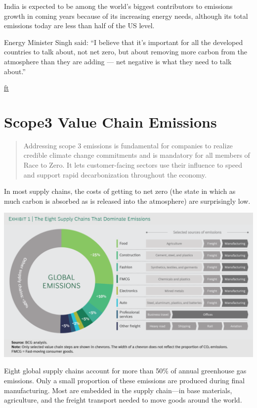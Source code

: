 \documentclass[
]{book}
\begin{document}
India is expected to be among the world's biggest contributors to emissions growth in coming years because of its increasing energy needs, although its total emissions today are less than half of the US level.

Energy Minister Singh said: ``I believe that it's important for all the developed countries to talk about, not net zero, but about removing more carbon from the atmosphere than they are adding --- net negative is what they need to talk about.''

\href{https://www.ft.com/content/b45113f8-5b5b-4f3e-a450-0a2b100595f6?shareType=nongift}{ft}

\hypertarget{scope3-value-chain-emissions}{%
\section{Scope3 Value Chain Emissions}\label{scope3-value-chain-emissions}}

\begin{quote}
Addressing scope 3 emissions is fundamental for companies to realize credible climate change commitments and is mandatory for all members of Race to Zero. It lets customer-facing sectors use their influence to speed and support rapid decarbonization throughout the economy.
\end{quote}

In most supply chains, the costs of getting to net zero (the state in which as much carbon is absorbed as is released into the atmosphere) are surprisingly low.

\includegraphics{fig/bcg_8supply_chains.png}

Eight global supply chains account for more than 50\% of annual greenhouse gas emissions. Only a small proportion of these emissions are produced during final manufacturing. Most are embedded in the supply chain---in base materials, agriculture, and the freight transport needed to move goods around the world.
\end{document}
